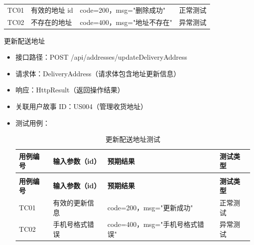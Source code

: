 \begin{levellist}
\begin{levellist}
\begin{itemize}
\begin{longtable}{>{\centering\arraybackslash}m{1.7cm} >{\centering\arraybackslash}m{3cm} >{\centering\arraybackslash}m{6.3cm} >{\centering\arraybackslash}m{2cm}}
                      \bottomrule
                      \endfoot

                      TC01          & 有效的地址 id          & code=200，msg="删除成功"  & 正常测试          \\
                      TC02          & 不存在的地址            & code=400，msg="地址不存在" & 异常测试          \\
                  \end{longtable}
        \end{itemize}

        \item 更新配送地址
        \begin{itemize}
            \item 接口路径：POST /api/addresses/updateDeliveryAddress
            \item 请求体：DeliveryAddress（请求体包含地址更新信息）
            \item 响应：HttpResult（返回操作结果）
            \item 关联用户故事 ID：US004（管理收货地址）
            \item 测试用例：
                  \begin{longtable}{>{\centering\arraybackslash}m{1.7cm} >{\centering\arraybackslash}m{4cm} >{\centering\arraybackslash}m{5.5cm} >{\centering\arraybackslash}m{1.8cm}}

                      \caption{更新配送地址测试} \label{tab:training}                                    \\

                      \toprule
                      \textbf{用例编号} & \textbf{输入参数（id）} & \textbf{预期结果}          & \textbf{测试类型} \\
                      \midrule
                      \endfirsthead

                      \multicolumn{4}{c}{{\tablename\ \thetable{} 续表}}                           \\
                      \toprule
                      \textbf{用例编号} & \textbf{输入参数（id）} & \textbf{预期结果}          & \textbf{测试类型} \\
                      \midrule
                      \endhead

                      \bottomrule
                      \endfoot

                      TC01          & 有效的更新信息           & code=200，msg="更新成功"    & 正常测试          \\
                      TC02          & 手机号格式错误           & code=400，msg="手机号格式错误" & 异常测试          \\
                  \end{longtable}
        \end{itemize}


\end{levellist}
\end{levellist}
